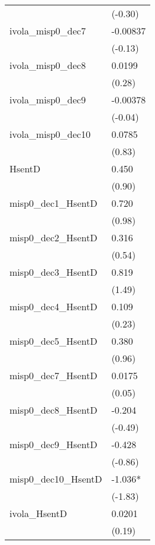 \begin{tabular}{lc}
        & \multicolumn{1}{l}{(-0.30)} \\
ivola_misp0_dec7 & \multicolumn{1}{l}{-0.00837} \\
        & \multicolumn{1}{l}{(-0.13)} \\
ivola_misp0_dec8 & \multicolumn{1}{l}{0.0199} \\
        & \multicolumn{1}{l}{(0.28)} \\
ivola_misp0_dec9 & \multicolumn{1}{l}{-0.00378} \\
        & \multicolumn{1}{l}{(-0.04)} \\
ivola_misp0_dec10 & \multicolumn{1}{l}{0.0785} \\
        & \multicolumn{1}{l}{(0.83)} \\
HsentD  & \multicolumn{1}{l}{0.450} \\
        & \multicolumn{1}{l}{(0.90)} \\
misp0_dec1_HsentD & \multicolumn{1}{l}{0.720} \\
        & \multicolumn{1}{l}{(0.98)} \\
misp0_dec2_HsentD & \multicolumn{1}{l}{0.316} \\
        & \multicolumn{1}{l}{(0.54)} \\
misp0_dec3_HsentD & \multicolumn{1}{l}{0.819} \\
        & \multicolumn{1}{l}{(1.49)} \\
misp0_dec4_HsentD & \multicolumn{1}{l}{0.109} \\
        & \multicolumn{1}{l}{(0.23)} \\
misp0_dec5_HsentD & \multicolumn{1}{l}{0.380} \\
        & \multicolumn{1}{l}{(0.96)} \\
misp0_dec7_HsentD & \multicolumn{1}{l}{0.0175} \\
        & \multicolumn{1}{l}{(0.05)} \\
misp0_dec8_HsentD & \multicolumn{1}{l}{-0.204} \\
        & \multicolumn{1}{l}{(-0.49)} \\
misp0_dec9_HsentD & \multicolumn{1}{l}{-0.428} \\
        & \multicolumn{1}{l}{(-0.86)} \\
misp0_dec10_HsentD & \multicolumn{1}{l}{-1.036*} \\
        & \multicolumn{1}{l}{(-1.83)} \\
ivola_HsentD & \multicolumn{1}{l}{0.0201} \\
        & \multicolumn{1}{l}{(0.19)} \\

\end{tabular}

